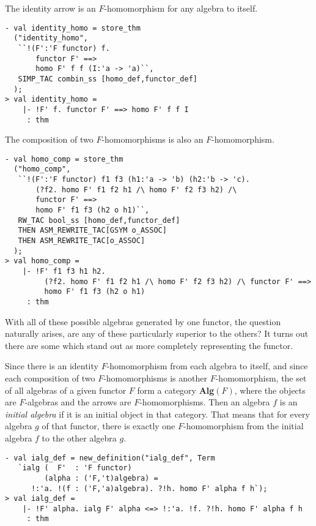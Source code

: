 The identity arrow is an $F$-homomorphism for any algebra to itself.
\begin{session}
\begin{verbatim}
- val identity_homo = store_thm
  ("identity_homo",
   ``!(F':'F functor) f.
       functor F' ==>
       homo F' f f (I:'a -> 'a)``,
   SIMP_TAC combin_ss [homo_def,functor_def]
  );
> val identity_homo =
    |- !F' f. functor F' ==> homo F' f f I
     : thm
\end{verbatim}
\end{session}

The composition of two $F$-homomorphisms is also an $F$-homomorphism.
\begin{session}
\begin{verbatim}
- val homo_comp = store_thm
  ("homo_comp",
   ``!(F':'F functor) f1 f3 (h1:'a -> 'b) (h2:'b -> 'c).
       (?f2. homo F' f1 f2 h1 /\ homo F' f2 f3 h2) /\
       functor F' ==>
       homo F' f1 f3 (h2 o h1)``,
   RW_TAC bool_ss [homo_def,functor_def]
   THEN ASM_REWRITE_TAC[GSYM o_ASSOC]
   THEN ASM_REWRITE_TAC[o_ASSOC]
  );
> val homo_comp =
    |- !F' f1 f3 h1 h2.
         (?f2. homo F' f1 f2 h1 /\ homo F' f2 f3 h2) /\ functor F' ==>
         homo F' f1 f3 (h2 o h1)
     : thm
\end{verbatim}
\end{session}


With all of these possible algebras generated by one functor, the question naturally
arises, are any of these particularly superior to the others? It turns out there are some
which stand out as more completely representing the functor.

Since there is an identity $F$-homomorphism from each algebra to itself, and
since each composition of two $F$-homomorphisms is another $F$-homomorphism, 
the set of all algebras of a given functor $F$ form a category {\bf Alg}$(F)$, 
where the objects are $F$-algebras and the arrows are $F$-homomorphisms. Then an algebra $f$ 
is an {\it initial algebra}\/ if it is an initial object in that category. That means that 
for every algebra $g$ of that functor, there is exactly one
$F$-homomorphism from the initial algebra $f$ to the other algebra $g$.
\begin{session}
\begin{verbatim}
- val ialg_def = new_definition("ialg_def", Term
   `ialg (  F'  : 'F functor)
         (alpha : ('F,'t)algebra) =
      !:'a. !(f : ('F,'a)algebra). ?!h. homo F' alpha f h`);
> val ialg_def =
    |- !F' alpha. ialg F' alpha <=> !:'a. !f. ?!h. homo F' alpha f h
     : thm
\end{verbatim}
\end{session}


